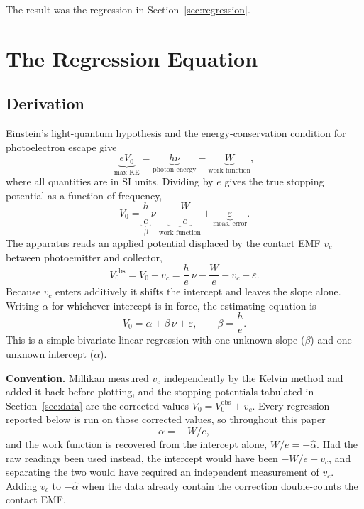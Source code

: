 \documentclass[12pt]{article}
\begin{document}
The result was the regression in Section~\ref{sec:regression}.

\section{The Regression Equation}
\label{sec:equation}

\subsection{Derivation}

Einstein's light-quantum hypothesis and the energy-conservation condition
for photoelectron escape give
\begin{equation}\label{eq:model}
  \underbrace{eV_0}_{\text{max KE}}
  = \underbrace{h\nu}_{\text{photon energy}}
  - \underbrace{W}_{\text{work function}},
\end{equation}
where all quantities are in SI units.  Dividing by $e$ gives the true
stopping potential as a function of frequency,
\begin{equation}\label{eq:obs}
  V_0 = \underbrace{\frac{h}{e}}_{\beta}\,\nu
        \;\underbrace{-\;\frac{W}{e}}_{\text{work function}}
        + \underbrace{\varepsilon}_{\text{meas.\ error}}.
\end{equation}
The apparatus reads an applied potential displaced by the contact EMF $v_c$
between photoemitter and collector,
\begin{equation}\label{eq:obs_raw}
  V_0^{\mathrm{obs}} = V_0 - v_c
  = \frac{h}{e}\,\nu - \frac{W}{e} - v_c + \varepsilon .
\end{equation}
Because $v_c$ enters additively it shifts the intercept and leaves the slope
alone.  Writing $\alpha$ for whichever intercept is in force, the estimating
equation is
\begin{equation}\label{eq:reg}
  \boxed{V_0 = \alpha + \beta\,\nu + \varepsilon, \qquad
  \beta = \frac{h}{e}.}
\end{equation}
This is a simple bivariate linear regression with one unknown slope ($\beta$)
and one unknown intercept ($\alpha$).

\medskip
\noindent\textbf{Convention.}  Millikan measured $v_c$ independently by the
Kelvin method and added it back before plotting, and the stopping potentials
tabulated in Section~\ref{sec:data} are the corrected values
$V_0 = V_0^{\mathrm{obs}} + v_c$.  Every regression reported below is run on
those corrected values, so throughout this paper
\begin{equation}\label{eq:alpha_meaning}
  \alpha = -\,W/e ,
\end{equation}
and the work function is recovered from the intercept alone,
$W/e = -\hat\alpha$.  Had the raw readings been used instead, the intercept
would have been $-W/e-v_c$, and separating the two would have required an
independent measurement of $v_c$.  Adding $v_c$ to $-\hat\alpha$ when the data
already contain the correction double-counts the contact EMF.
\end{document}
